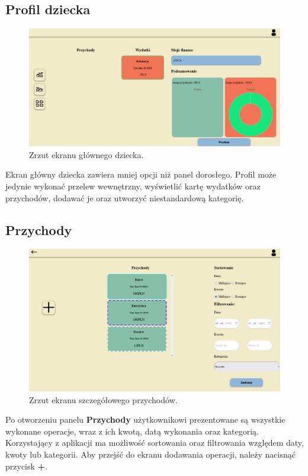 \documentclass[12pt,a4paper,oneside]{article}
\begin{document}
\subsection{Profil dziecka}
\begin{figure}[H]
    \centering
    \includegraphics[width=\hsize,keepaspectratio]{images/childs_profile.png}
    \caption{Zrzut ekranu głównego dziecka.}
\end{figure}
Ekran główny dziecka zawiera mniej opcji niż panel dorosłego. Profil może
jedynie wykonać przelew wewnętrzny, wyświetlić kartę wydatków oraz przychodów,
dodawać je oraz utworzyć niestandardową kategorię.

\subsection{Przychody}
\begin{figure}[H]
    \centering
    \includegraphics[width=\hsize,keepaspectratio]{images/incomes_card.png}
    \caption{Zrzut ekranu szczegółowego przychodów.}
\end{figure}
Po otworzeniu panelu \textbf{Przychody} użytkownikowi prezentowane są wszystkie
wykonane operacje, wraz z ich kwotą, datą wykonania oraz kategorią. Korzystający
z aplikacji ma możliwość sortowania oraz filtrowania względem daty, kwoty lub
kategorii. Aby przejść do ekranu dodawania operacji, należy nacisnąć przycisk
\textbf{+}.
\end{document}
